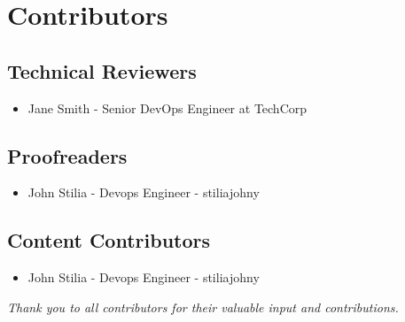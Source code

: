 \chapter*{Contributors}
\section*{Technical Reviewers}
\begin{itemize}[noitemsep]
    \item Jane Smith - Senior DevOps Engineer at TechCorp
\end{itemize}

\section*{Proofreaders}
\begin{itemize}[noitemsep]
    \item John Stilia - Devops Engineer - stiliajohny

\end{itemize}

\section*{Content Contributors}
\begin{itemize}[noitemsep]
    \item John Stilia - Devops Engineer - stiliajohny
\end{itemize}

\vspace{0.5cm}
\begin{center}
\small\emph{Thank you to all contributors for their valuable input and contributions.}
\end{center}

\clearpage